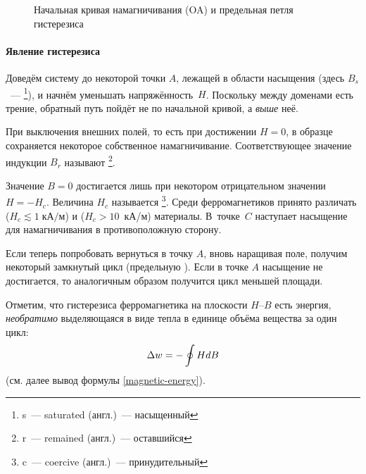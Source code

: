 \begin{figure}[h!]
    \centering
    \caption{Начальная кривая намагничивания (OA) и предельная петля гистерезиса}
\end{figure}

\paragraph{Явление гистерезиса}

Доведём систему до некоторой точки $A$, лежащей в области
насыщения (здесь $B_s$~--- \footnote[1]{s~--- saturated
(англ.)~--- насыщенный}), и начнём уменьшать напряжённость~$H$.
Поскольку между доменами есть трение, обратный путь
пойдёт не по начальной кривой, а \emph{выше} неё.

При выключения внешних полей, то есть при достижении $H = 0$,
в образце сохраняется некоторое собственное намагничивание.
Соответствующее значение индукции $B_r$
называют \footnote[2]{r~--- remained (англ.)~--- оставшийся}.

Значение $B = 0$ достигается лишь при некотором отрицательном значении
$H = - H_c$. Величина $H_c$ называется
\footnote[3]{c~--- coercive (англ.)~--- принудительный}.
Среди ферромагнетиков принято различать  
($H_c \lesssim 1\;кА/м$) и  ($H_c > 10$~кА/м) материалы. 
В~точке~$C$ наступает насыщение для намагничивания в противоположную сторону.

Если теперь попробовать вернуться в точку $A$, вновь наращивая поле,
получим некоторый замкнутый цикл (предельную ). Если
в точке $A$ насыщение не достигается, то аналогичным образом  получится
цикл меньшей площади.

Отметим, что  гистерезиса ферромагнетика на плоскости
$H$--$B$ есть энергия, \emph{необратимо} выделяющаяся в виде 
тепла в единице объёма вещества за один цикл:
\begin{equation}
    \eqmark{HdB}
    \Delta w = -\oint {HdB}
\end{equation}
(см. далее вывод формулы \eqref{magnetic-energy}).

